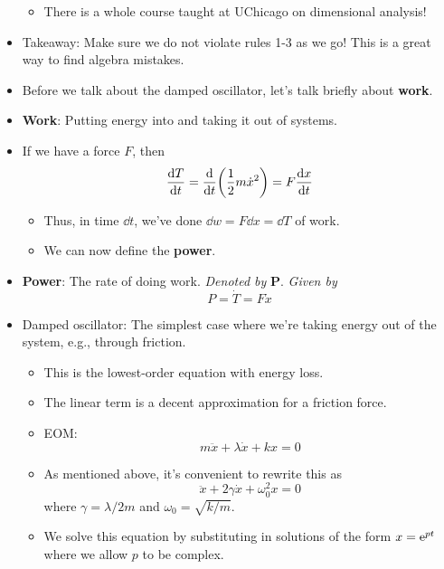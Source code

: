 \documentclass[../notes.tex]{subfiles}
\begin{document}
\begin{itemize}
\begin{itemize}
        \item There is a whole course taught at UChicago on dimensional analysis!
    \end{itemize}
    \item Takeaway: Make sure we do not violate rules 1-3 as we go! This is a great way to find algebra mistakes.
    \item Before we talk about the damped oscillator, let's talk briefly about \textbf{work}.
    \item \textbf{Work}: Putting energy into and taking it out of systems.
    \item If we have a force $F$, then
    \begin{equation*}
        \dv{T}{t} = \dv{t}(\frac{1}{2}m\dot{x}^2)
        = F\dv{x}{t}
    \end{equation*}
    \begin{itemize}
        \item Thus, in time $\dd{t}$, we've done $\dd{w}=F\dd{x}=\dd{T}$ of work.
        \item We can now define the \textbf{power}.
    \end{itemize}
    \item \textbf{Power}: The rate of doing work. \emph{Denoted by} $\bm{P}$. \emph{Given by}
    \begin{equation*}
        P = \dot{T} = F\dot{x}
    \end{equation*}
    \item Damped oscillator: The simplest case where we're taking energy out of the system, e.g., through friction.
    \begin{itemize}
        \item This is the lowest-order equation with energy loss.
        \item The linear term is a decent approximation for a friction force.
        \item EOM:
        \begin{equation*}
            m\ddot{x}+\lambda\dot{x}+kx = 0
        \end{equation*}
        \item As mentioned above, it's convenient to rewrite this as
        \begin{equation*}
            \ddot{x}+2\gamma\dot{x}+\omega_0^2x = 0
        \end{equation*}
        where $\gamma=\lambda/2m$ and $\omega_0=\sqrt{k/m}$.
        \item We solve this equation by substituting in solutions of the form $x=\e[pt]$ where we allow $p$ to be complex.

\end{itemize}
\end{itemize}
\end{document}
